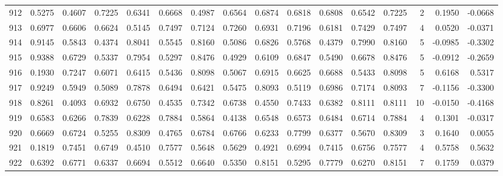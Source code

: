\begin{tabular}{lrrrrrrrrrrrrrrr}
912 &      0.5275 &  0.4607 &  0.7225 &  0.6341 &  0.6668 &  0.4987 &  0.6564 &  0.6874 &  0.6818 &  0.6808 &   0.6542 &     0.7225 &      2 &                    0.1950 &                    -0.0668 \\
913 &      0.6977 &  0.6606 &  0.6624 &  0.5145 &  0.7497 &  0.7124 &  0.7260 &  0.6931 &  0.7196 &  0.6181 &   0.7429 &     0.7497 &      4 &                    0.0520 &                    -0.0371 \\
914 &      0.9145 &  0.5843 &  0.4374 &  0.8041 &  0.5545 &  0.8160 &  0.5086 &  0.6826 &  0.5768 &  0.4379 &   0.7990 &     0.8160 &      5 &                   -0.0985 &                    -0.3302 \\
915 &      0.9388 &  0.6729 &  0.5337 &  0.7954 &  0.5297 &  0.8476 &  0.4929 &  0.6109 &  0.6847 &  0.5490 &   0.6678 &     0.8476 &      5 &                   -0.0912 &                    -0.2659 \\
916 &      0.1930 &  0.7247 &  0.6071 &  0.6415 &  0.5436 &  0.8098 &  0.5067 &  0.6915 &  0.6625 &  0.6688 &   0.5433 &     0.8098 &      5 &                    0.6168 &                     0.5317 \\
917 &      0.9249 &  0.5949 &  0.5089 &  0.7878 &  0.6494 &  0.6421 &  0.5475 &  0.8093 &  0.5119 &  0.6986 &   0.7174 &     0.8093 &      7 &                   -0.1156 &                    -0.3300 \\
918 &      0.8261 &  0.4093 &  0.6932 &  0.6750 &  0.4535 &  0.7342 &  0.6738 &  0.4550 &  0.7433 &  0.6382 &   0.8111 &     0.8111 &     10 &                   -0.0150 &                    -0.4168 \\
919 &      0.6583 &  0.6266 &  0.7839 &  0.6228 &  0.7884 &  0.5864 &  0.4138 &  0.6548 &  0.6573 &  0.6484 &   0.6714 &     0.7884 &      4 &                    0.1301 &                    -0.0317 \\
920 &      0.6669 &  0.6724 &  0.5255 &  0.8309 &  0.4765 &  0.6784 &  0.6766 &  0.6233 &  0.7799 &  0.6377 &   0.5670 &     0.8309 &      3 &                    0.1640 &                     0.0055 \\
921 &      0.1819 &  0.7451 &  0.6749 &  0.4510 &  0.7577 &  0.5648 &  0.5629 &  0.4921 &  0.6994 &  0.7415 &   0.6756 &     0.7577 &      4 &                    0.5758 &                     0.5632 \\
922 &      0.6392 &  0.6771 &  0.6337 &  0.6694 &  0.5512 &  0.6640 &  0.5350 &  0.8151 &  0.5295 &  0.7779 &   0.6270 &     0.8151 &      7 &                    0.1759 &                     0.0379 \\

\end{tabular}
